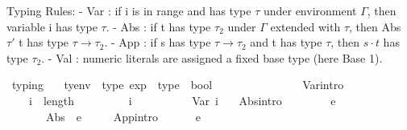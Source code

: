 \begin{isabellebody}
\begin{isamarkuptext}
Typing Rules:
  - Var :
    if i is in range and has type $\tau$ under environment $\Gamma$,
    then variable i has type $\tau$.
  - Abs :
    if t has type $\tau_2$ under $\Gamma$ extended with $\tau$,
    then Abs $\tau'$ t has type $\tau \to \tau_2$.
  - App :
    if s has type $\tau \to \tau_2$ and t has type $\tau$,
    then $s \cdot t$ has type $\tau_2$.
  - Val : numeric literals are assigned a fixed base type (here Base 1).%
\end{isamarkuptext}\isamarkuptrue%
\isamarkupfalse%
\ typing\ {\isacharcolon}{\kern0pt}{\isacharcolon}{\kern0pt}\isanewline
\ \ {\isachardoublequoteopen}tyenv\ {\isasymRightarrow}\ type\ exp\ {\isasymRightarrow}\ type\ {\isasymRightarrow}\ bool{\isachardoublequoteclose}\isanewline
\ \ {\isacharparenleft}{\kern0pt}{\isacartoucheopen}{\isacharunderscore}{\kern0pt}\ {\isasymturnstile}\ {\isacharunderscore}{\kern0pt}\ {\isacharcolon}{\kern0pt}\ {\isacharunderscore}{\kern0pt}{\isacartoucheclose}\ {\isacharbrackleft}{\kern0pt}{}{}{\isacharcomma}{\kern0pt}\ {}{}{\isacharcomma}{\kern0pt}\ {}{}{\isacharbrackright}{\kern0pt}\ {}{}{\isacharparenright}{\kern0pt}\isanewline
\ \ \isanewline
\ \ Var{\isacharbrackleft}{\kern0pt}intro{\isacharbang}{\kern0pt}{\isacharbrackright}{\kern0pt}{\isacharcolon}{\kern0pt}\isanewline
\ \ \ \ {\isachardoublequoteopen}i\ {\isacharless}{\kern0pt}\ length\ {\isasymGamma}\ {\isasymLongrightarrow}\isanewline
\ \ \ \ \ {\isasymGamma}\ {\isacharbang}{\kern0pt}\ i\ {\isacharequal}{\kern0pt}\ {\isasymtau}\ {\isasymLongrightarrow}\isanewline
\ \ \ \ \ {\isasymGamma}\ {\isasymturnstile}\ Var\ i\ {\isacharcolon}{\kern0pt}\ {\isasymtau}{\isachardoublequoteclose}\isanewline
{\isacharbar}{\kern0pt}\ Abs{\isacharbrackleft}{\kern0pt}intro{\isacharbang}{\kern0pt}{\isacharbrackright}{\kern0pt}{\isacharcolon}{\kern0pt}\isanewline
\ \ \ \ {\isachardoublequoteopen}{\isasymtau}{}\ {\isacharhash}{\kern0pt}\ {\isasymGamma}\ {\isasymturnstile}\ e\ {\isacharcolon}{\kern0pt}\ {\isasymtau}{}\ {\isasymLongrightarrow}\isanewline
\ \ \ \ \ {\isasymGamma}\ {\isasymturnstile}\ Abs\ {\isasymtau}{}\ e\ {\isacharcolon}{\kern0pt}\ {\isasymtau}{}\ {\isasymRightarrow}\ {\isasymtau}{}{\isachardoublequoteclose}\isanewline
{\isacharbar}{\kern0pt}\ App{\isacharbrackleft}{\kern0pt}intro{\isacharbang}{\kern0pt}{\isacharbrackright}{\kern0pt}{\isacharcolon}{\kern0pt}\isanewline
\ \ \ \ {\isachardoublequoteopen}{\isasymGamma}\ {\isasymturnstile}\ e{}\ {\isacharcolon}{\kern0pt}\ {\isasymtau}{}\ {\isasymRightarrow}\ {\isasymtau}{}\ {\isasymLongrightarrow}\isanewline

\end{isabellebody}
